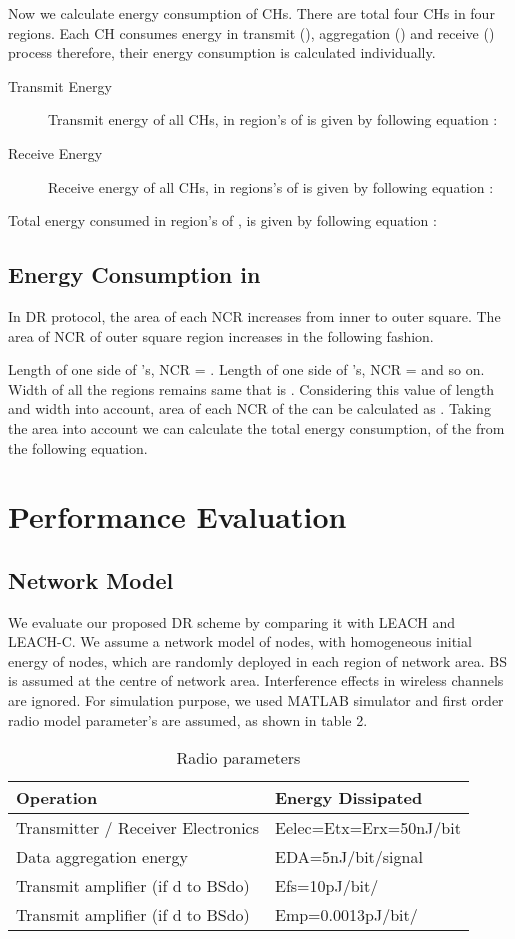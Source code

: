 \documentclass[3p,times,procedia]{elsarticle}
\begin{document}
Now we calculate energy consumption of CHs. There are total four CHs in four regions. Each CH consumes energy in transmit (), aggregation () and receive () process therefore, their energy consumption is calculated individually.
\begin{description}
  \item[Transmit Energy]
    
  Transmit energy of all CHs,  in region's of  is given by following equation :
    

  \item[Receive Energy]
   
   Receive energy of all CHs,  in regions's of  is given by following equation :
    

\end{description}
Total energy consumed in region's of ,  is given by following equation :

\subsection{Energy Consumption in }
In DR protocol, the area of each NCR increases from inner to outer square. The area of NCR of outer square region increases in the following fashion.

Length of one side of 's, NCR = . Length of one side of 's, NCR =  and so on. Width of all the regions remains same that is . Considering this value of length and width into account, area of each NCR of the  can be calculated as . Taking the area into account we can calculate the total energy consumption,  of the  from the following equation.




\section{Performance Evaluation}        \subsection{Network Model}
We evaluate our proposed DR scheme by comparing it with LEACH and LEACH-C. We assume a network model of  nodes, with homogeneous initial energy of nodes, which are randomly deployed in each region of   network area. BS is assumed at the centre of network area. Interference effects in wireless channels are ignored. For simulation purpose, we used MATLAB simulator and first order radio model parameter's are assumed, as shown in table 2.
\begin{table}[h]
\centering
\caption{Radio parameters}
\begin{tabular}{|l|l|}
\hline
Operation & Energy Dissipated  \\
\hline
Transmitter / Receiver Electronics  & Eelec=Etx=Erx=50nJ/bit \\
\hline
Data aggregation energy & EDA=5nJ/bit/signal \\
\hline
Transmit amplifier (if d to BSdo) & Efs=10pJ/bit/ \\
\hline
Transmit amplifier (if d to BSdo) & Emp=0.0013pJ/bit/\\
\hline
\end{tabular}
\end{table}
\end{document}
